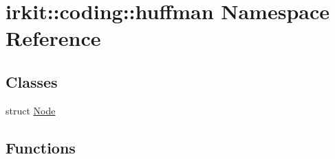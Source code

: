 \hypertarget{namespaceirkit_1_1coding_1_1huffman}{}\section{irkit\+:\+:coding\+:\+:huffman Namespace Reference}
\label{namespaceirkit_1_1coding_1_1huffman}
\subsection*{Classes}
\begin{DoxyCompactItemize}
\item 
struct \mbox{\hyperlink{structirkit_1_1coding_1_1huffman_1_1Node}{Node}}
\end{DoxyCompactItemize}
\subsection*{Functions}
